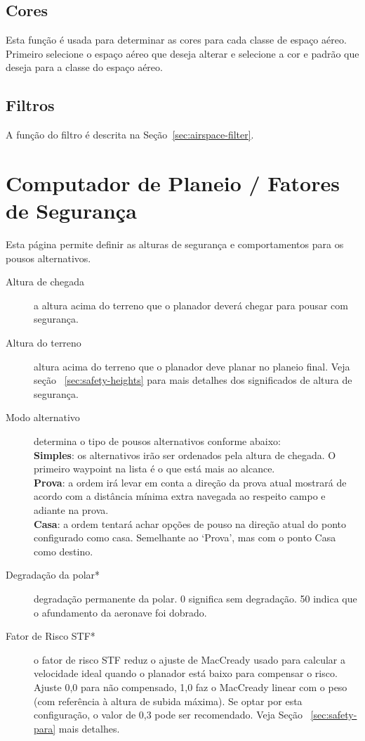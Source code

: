 \subsection*{Cores}
Esta função é usada para determinar as cores para cada classe de espaço aéreo.  Primeiro selecione o espaço aéreo que deseja alterar e selecione a cor e padrão que deseja para a classe do espaço aéreo.

\subsection*{Filtros}
A função do filtro é descrita na Seção~\ref{sec:airspace-filter}.


\section{Computador de Planeio / Fatores de Segurança}

Esta página permite definir as alturas de segurança e comportamentos para os pousos alternativos.

\begin{description}
\item[Altura de chegada]  a altura acima do terreno que o planador deverá chegar para pousar com segurança.
\item[Altura do terreno]  \label{conf:safetyterrain} altura acima do terreno que o planador deve planar no planeio final.  Veja seção
  ~\ref{sec:safety-heights} para mais detalhes dos significados de altura de segurança. \\
\item[Modo alternativo]  \label{conf:alternatesmode} determina o tipo de pousos alternativos conforme abaixo: \\
  {\bf Simples}: os alternativos irão ser ordenados pela altura de chegada.  O primeiro waypoint na lista é o que está mais ao alcance.   \\
  {\bf Prova}: a ordem irá levar em conta a direção da prova atual mostrará de acordo com a distância mínima extra navegada ao respeito campo e adiante na prova. \\
  {\bf Casa}: a ordem tentará achar opções de pouso na direção atual do ponto configurado como casa.  Semelhante ao ‘Prova’, mas com o ponto Casa como destino.
\item[Degradação da polar*]  degradação permanente da polar. 0 significa sem degradação.  50 indica que o afundamento da aeronave foi dobrado.\label{conf:safetyMC} 
\item[Fator de Risco STF*] 
 o fator de risco STF reduz o ajuste de MacCready usado para calcular a velocidade ideal quando o planador está baixo para compensar o risco.  Ajuste 0,0 para não compensado, 1,0 faz o 
 MacCready linear com o peso (com referência à altura de subida máxima).  Se optar por esta configuração, o valor de 0,3 pode ser recomendado.  Veja Seção ~\ref{sec:safety-para} mais detalhes.
\end{description}


